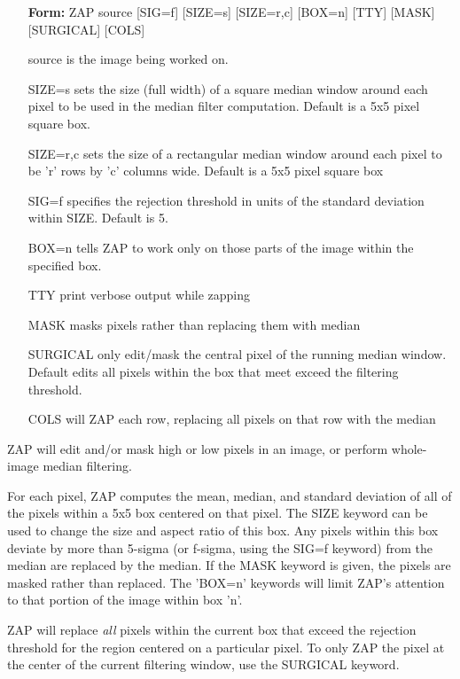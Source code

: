\begin{itemize}
  \item[\textbf{Form: }ZAP source {[SIG=f]} {[SIZE=s]} {[SIZE=r,c]} 
       {[BOX=n]} {[TTY]} {[MASK]} {[SURGICAL]} {[COLS]} \hfill]{}
  \item[source]{is the} image being worked on.
  \item[SIZE=s]{sets the size (full width) of a square median
       window around each pixel to be used in the median filter
       computation.  Default is a 5x5 pixel square box.}
  \item[SIZE=r,c]{sets the size of a rectangular median window
       around each pixel to be 'r' rows by 'c' columns wide.  Default
       is a 5x5 pixel square box}
  \item[SIG=f]{specifies the rejection threshold in units
       of the standard deviation within SIZE.  Default is 5}.
  \item[BOX=n]{tells ZAP to work only on those parts of the image
       within the specified box}.
  \item[TTY]{print verbose output while zapping}
  \item[MASK]{masks pixels rather than replacing them with median}
  \item[SURGICAL]{only edit/mask the central pixel of the running
       median window.  Default edits all pixels within the box that
       meet exceed the filtering threshold.}
  \item[COLS]{will ZAP each row, replacing all pixels on that row with the median}
\end{itemize}

ZAP will edit and/or mask high or low pixels in an image, or perform
whole-image median filtering.  

For each pixel, ZAP computes the mean, median, and standard deviation of
all of the pixels within a 5x5 box centered on that pixel.  The SIZE
keyword can be used to change the size and aspect ratio of this box.  Any
pixels within this box deviate by more than 5-sigma (or f-sigma, using the
SIG=f keyword) from the median are replaced by the median.  If the MASK
keyword is given, the pixels are masked rather than replaced.  The 'BOX=n'
keywords will limit ZAP's attention to that portion of the image within box
'n'.

ZAP will replace \textit{all} pixels within the current box that exceed the
rejection threshold for the region centered on a particular pixel.  To only
ZAP the pixel at the center of the current filtering window, use the
SURGICAL keyword.

